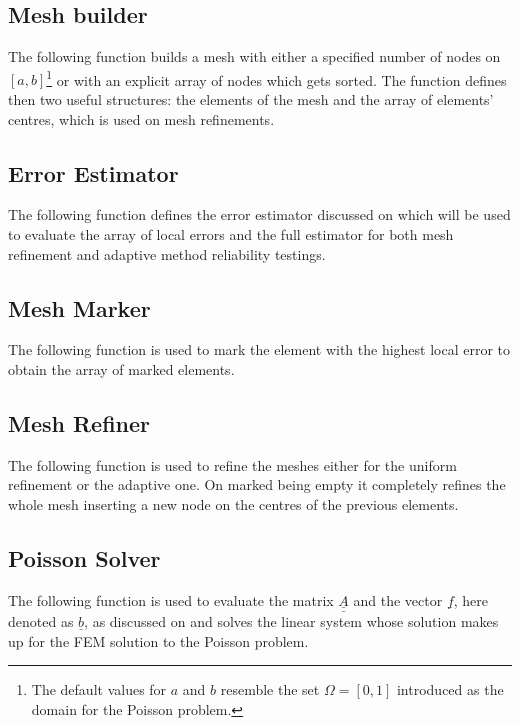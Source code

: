 \subsection{Mesh builder}

The following function builds a mesh with either a specified number of nodes on $[a, b]$\footnote{The default values for $a$ and $b$ resemble the set $\Omega = [0, 1]$ introduced as the domain for the Poisson problem.} or with an explicit array of nodes which gets sorted. The function defines then two useful structures: the elements of the mesh and the array of elements' centres, which is used on mesh refinements.



\newpage
\subsection{Error Estimator}

The following function defines the error estimator discussed on  which will be used to evaluate the array of local errors and the full estimator for both mesh refinement and adaptive method reliability testings.



\newpage
\subsection{Mesh Marker}

The following function is used to mark the element with the highest local error to obtain the array of marked elements.



\newpage
\subsection{Mesh Refiner}

The following function is used to refine the meshes either for the uniform refinement or the adaptive one. On marked being empty it completely refines the whole mesh inserting a new node on the centres of the previous elements.



\newpage
\subsection{Poisson Solver}

The following function is used to evaluate the matrix $\underline{\underline{A}}$ and the vector $\underline{f}$, here denoted as $\underline{b}$, as discussed on  and solves the linear system whose solution makes up for the FEM solution to the Poisson problem.

